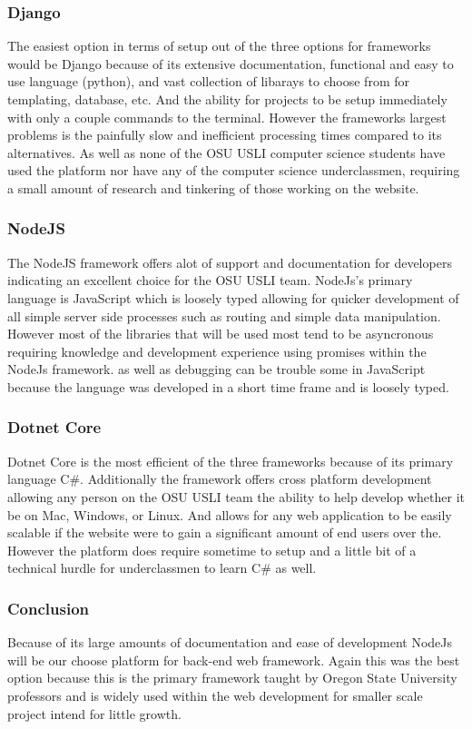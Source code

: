 \documentclass[onecolumn, draftclsnofoot,10pt, compsoc]{IEEEtran}
\begin{document}
\subsubsection{Django}
The easiest option in terms of setup out of the three options for frameworks would be Django because of its extensive documentation, functional and easy to use language (python), and vast collection of libarays to choose from for templating, database, etc. And the ability for projects to be setup immediately with only a couple commands to the terminal\cite{Django:online}. However the frameworks largest problems is the painfully slow and inefficient processing times compared to its alternatives. As well as none of the OSU USLI computer science students have used the platform nor have any of the computer science underclassmen, requiring a small amount of research and tinkering of those working on the website. 
\subsubsection{NodeJS}
The NodeJS framework offers alot of support and documentation for developers indicating an excellent choice for the OSU USLI team. NodeJs's primary language is JavaScript which is loosely typed allowing for quicker development of all simple server side processes such as routing and simple data manipulation. However most of the libraries that will be used most tend to be asyncronous requiring knowledge and development experience using promises within the NodeJs framework. as well as debugging can be trouble some in JavaScript because the language was developed in a short time frame and is loosely typed.
\subsubsection{Dotnet Core}
Dotnet Core is the most efficient of the three frameworks because of its primary language C\#. Additionally the framework offers cross platform development allowing any person on the OSU USLI team the ability to help develop whether it be on Mac, Windows, or Linux. And allows for any web application to be easily scalable if the website were to gain a significant amount of end users over the. However the platform does require sometime to setup and a little bit of a technical hurdle for underclassmen to learn C\# as well. 
\subsubsection{Conclusion}
Because of its large amounts of documentation and ease of development NodeJs will be our choose platform for back-end web framework. Again this was the best option because this is the primary framework taught by Oregon State University professors and is widely used within the web development for smaller scale project intend for little growth.
\end{document}
